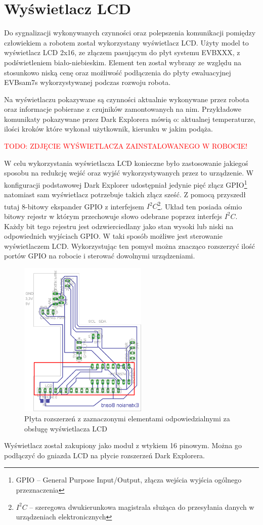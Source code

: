 \section{Wyświetlacz LCD}
Do sygnalizacji wykonywanych czynności oraz polepszenia komunikacji pomiędzy człowiekiem a robotem został wykorzystany wyświetlacz LCD. Użyty model to wyświetlacz LCD 2x16, ze złączem pasującym do płyt systemu EVBXXX, z podświetleniem biało-niebieskim. Element ten został wybrany ze względu na stosunkowo niską cenę oraz możliwość podłączenia do płyty ewaluacyjnej EVBsam7s wykorzystywanej podczas rozwoju robota.

Na wyświetlaczu pokazywane są czynności aktualnie wykonywane przez robota oraz informacje pobierane z czujników zamontowanych na nim. Przykładowe komunikaty pokazywane przez Dark Explorera mówią o: aktualnej temperaturze, ilości kroków które wykonał użytkownik, kierunku w jakim podąża.

\textcolor{red}{TODO: ZDJĘCIE WYŚWIETLACZA ZAINSTALOWANEGO W ROBOCIE!}

W celu wykorzystania wyświetlacza LCD konieczne było zastosowanie jakiegoś sposobu na redukcję wejść oraz wyjść wykorzystywanych przez to urządzenie. W konfiguracji podstawowej Dark Explorer udostępniał jedynie pięć złącz GPIO\footnote{GPIO -- General Purpose Input/Output, złącza wejścia wyjścia ogólnego przeznaczenia} natomiast sam wyświetlacz potrzebuje takich złącz sześć. Z pomocą przyszedł tutaj 8-bitowy ekspander GPIO z interfejsem $I^{2}C$\footnote{$I^{2}C$ -- szeregowa dwukierunkowa magistrala służąca do przesyłania danych w urządzeniach elektronicznych}. Układ ten posiada ośmio bitowy rejestr w którym przechowuje słowo odebrane poprzez interfejs $I^{2}C$. Każdy bit tego rejestru jest odzwierciedlany jako stan wysoki lub niski na odpowiednich wyjściach GPIO. W taki sposób możliwe jest sterowanie wyświetlaczem LCD. Wykorzystując ten pomysł można znacząco rozszerzyć ilość portów GPIO na robocie i sterować dowolnymi urządzeniami.

\begin{figure}[!ht]
 \centering
 \includegraphics[height=75mm]{../images/ch04/extension_board-LCD.png}
 \caption{Płyta rozszerzeń z zaznaczonymi elementami odpowiedzialnymi za obsługę wyświetlacza LCD}
 \label{fig:KmakPlatform}
\end{figure}

Wyświetlacz został zakupiony jako moduł z wtykiem 16 pinowym. Można go podłączyć do gniazda LCD na płycie rozszerzeń Dark Explorera.
